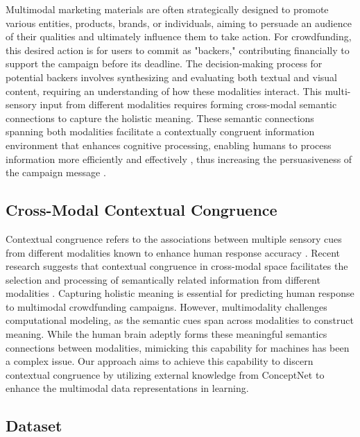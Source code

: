 Multimodal marketing materials are often strategically designed to promote various entities, products, brands, or individuals, aiming to persuade an audience of their qualities and ultimately influence them to take action. For crowdfunding, this desired action is for users to commit as "backers," contributing financially to support the campaign before its deadline. The decision-making process for potential backers involves synthesizing and evaluating both textual and visual content, requiring an understanding of how these modalities interact. This multi-sensory input from different modalities requires forming cross-modal semantic connections to capture the holistic meaning. These semantic connections spanning both modalities facilitate a contextually congruent information environment that enhances cognitive processing, enabling humans to process information more efficiently and effectively \cite{laurienti2004semantic,spence2011crossmodal}, thus increasing the persuasiveness of the campaign message \cite{schubert2021multimodal}. 
 
\vspace{-1em}
\subsection{Cross-Modal Contextual Congruence}
\label{sec:context-congruence}
\vspace{-1mm}

Contextual congruence refers to the associations between multiple sensory cues from different modalities known to enhance human response accuracy \cite{laurienti2004semantic,spence2011crossmodal}. Recent research suggests that contextual congruence in cross-modal space facilitates the selection and processing of semantically related information from different modalities \cite{almadori2021crossmodal,laurienti2004semantic,letts2022evaluating}. Capturing holistic meaning is essential for predicting human response to multimodal crowdfunding campaigns. However, multimodality challenges computational modeling, as the semantic cues span across modalities to construct meaning. 
While the human brain adeptly forms these meaningful semantics connections between modalities, mimicking this capability for machines has been a complex issue. 
Our approach aims to achieve this capability to discern contextual congruence by utilizing external knowledge from ConceptNet to enhance the multimodal data representations in learning. 

\vspace{-2mm}
\subsection{Dataset}
\label{sec:dataset}
\vspace{-1mm}

